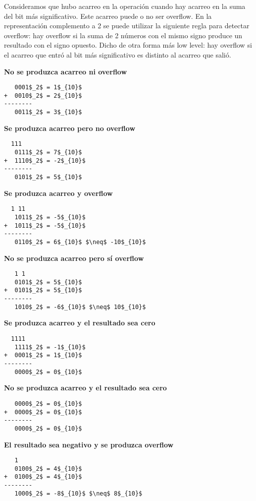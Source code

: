 Consideramos que hubo acarreo en la operación cuando hay acarreo en la suma del bit más significativo. Este acarreo puede o no ser overflow. En la representación complemento a 2 se puede utilizar la siguiente regla para detectar overflow: hay overflow si la suma de 2 números con el mismo signo produce un resultado con el signo opuesto. Dicho de otra forma más low level: hay overflow si el acarreo que entró al bit más significativo es distinto al acarreo que salió.

\textbf{No se produzca acarreo ni overflow}
\begin{lstlisting}
   0001$_2$ = 1$_{10}$
+  0010$_2$ = 2$_{10}$
--------
   0011$_2$ = 3$_{10}$
\end{lstlisting}

\textbf{Se produzca acarreo pero no overflow}
\begin{lstlisting}
  111
   0111$_2$ = 7$_{10}$
+  1110$_2$ = -2$_{10}$
--------
   0101$_2$ = 5$_{10}$
\end{lstlisting}

\textbf{Se produzca acarreo y overflow}
\begin{lstlisting}
  1 11
   1011$_2$ = -5$_{10}$
+  1011$_2$ = -5$_{10}$
--------
   0110$_2$ = 6$_{10}$ $\neq$ -10$_{10}$
\end{lstlisting}

\textbf{No se produzca acarreo pero sí overflow}
\begin{lstlisting}
   1 1
   0101$_2$ = 5$_{10}$
+  0101$_2$ = 5$_{10}$
--------
   1010$_2$ = -6$_{10}$ $\neq$ 10$_{10}$
\end{lstlisting}

\textbf{Se produzca acarreo y el resultado sea cero}
\begin{lstlisting}
  1111
   1111$_2$ = -1$_{10}$
+  0001$_2$ = 1$_{10}$
--------
   0000$_2$ = 0$_{10}$
\end{lstlisting}

\textbf{No se produzca acarreo y el resultado sea cero}
\begin{lstlisting}
   0000$_2$ = 0$_{10}$
+  0000$_2$ = 0$_{10}$
--------
   0000$_2$ = 0$_{10}$
\end{lstlisting}

\textbf{El resultado sea negativo y se produzca overflow}
\begin{lstlisting}
   1
   0100$_2$ = 4$_{10}$
+  0100$_2$ = 4$_{10}$
--------
   1000$_2$ = -8$_{10}$ $\neq$ 8$_{10}$
\end{lstlisting}

\pagebreak

